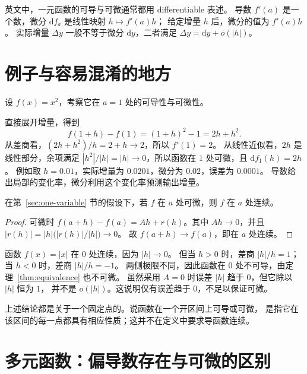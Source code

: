 \documentclass{ctexart}
\begin{document}
\begin{remark}[术语与记号]
英文中，一元函数的可导与可微通常都用 differentiable 表述。
导数 $f'(a)$ 是一个数，微分 $\mathrm df_a$ 是线性映射 $h\mapsto f'(a)h$；
给定增量 $h$ 后，微分的值为 $f'(a)h$。
实际增量 $\Delta y$ 一般不等于微分 $\mathrm dy$，二者满足
$\Delta y=\mathrm dy+o(|h|)$。
\end{remark}

\section{例子与容易混淆的地方}
\label{sec:examples}

\begin{example}[同一变化的两种观察方式]
设 $f(x)=x^2$，考察它在 $a=1$ 处的可导性与可微性。
\end{example}
\begin{solve}
直接展开增量，得到
\[
  f(1+h)-f(1)=(1+h)^2-1=2h+h^2.
\]
从差商看，$(2h+h^2)/h=2+h\to2$，所以 $f'(1)=2$。
从线性近似看，$2h$ 是线性部分，余项满足
$|h^2|/|h|=|h|\to0$，所以函数在 $1$ 处可微，且 $\mathrm df_1(h)=2h$。
例如取 $h=0.01$，实际增量为 $0.0201$，微分为 $0.02$，误差为 $0.0001$。
导数给出局部的变化率，微分利用这个变化率预测输出增量。
\end{solve}

\begin{proposition}[可微蕴含连续]
\label{prop:continuity}
在第~\ref{sec:one-variable} 节的假设下，若 $f$ 在 $a$ 处可微，则 $f$ 在 $a$ 处连续。
\end{proposition}
\begin{proof}
可微时 $f(a+h)-f(a)=Ah+r(h)$。其中 $Ah\to0$，并且
$|r(h)|=|h|\bigl(|r(h)|/|h|\bigr)\to0$。
故 $f(a+h)\to f(a)$，即在 $a$ 处连续。
\end{proof}

\begin{example}[连续不保证可导或可微]
函数 $f(x)=|x|$ 在 $0$ 处连续，因为 $|h|\to0$。
但当 $h>0$ 时，差商 $|h|/h=1$；当 $h<0$ 时，差商 $|h|/h=-1$。
两侧极限不同，因此函数在 $0$ 处不可导，由定理~\ref{thm:equivalence} 也不可微。
虽然采用 $A=0$ 时误差 $|h|$ 趋于 $0$，但它除以 $|h|$ 恒为 $1$，
并不是 $o(|h|)$。这说明仅有误差趋于 $0$，不足以保证可微。
\end{example}

上述结论都是关于一个固定点的。说函数在一个开区间上可导或可微，
是指它在该区间的每一点都具有相应性质；这并不在定义中要求导函数连续。

\section{多元函数：偏导数存在与可微的区别}
\label{sec:several-variables}
\end{document}
